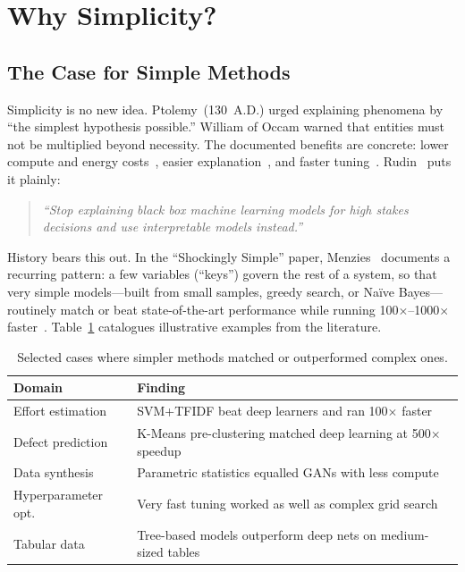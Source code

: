 \documentclass[AMA,STIX2COL]{WileyNJDv5}
\begin{document}
\section{Why Simplicity?}\label{sec:simplicity}

\subsection{The Case for Simple Methods}

Simplicity is no new idea. Ptolemy~(130~A.D.) urged
explaining phenomena by ``the simplest hypothesis
possible.'' William of Occam warned that entities must
not be multiplied beyond necessity. The documented benefits
are concrete: lower compute and energy
costs~\cite{calrero15,monserrate2022cloud}, easier
explanation~\cite{veerappa2011understanding}, and faster
tuning~\cite{fu2016tuning}. Rudin~\cite{rudin2019stop}
puts it plainly:

\begin{quote}
{\em ``Stop explaining black box machine learning models
for high stakes decisions and use interpretable models
instead.''}
\end{quote}

History bears this out. In the ``Shockingly Simple'' paper,
Menzies~\cite{Menzies21shockingly} documents a recurring
pattern: a few variables (``keys'') govern the rest of a
system, so that very simple models---built from small
samples, greedy search, or Na{\"i}ve Bayes---routinely
match or beat state-of-the-art performance while running
100$\times$--1000$\times$
faster~\cite{majumder2018500+,grinsztajn2022why,%
Tawosi23,Ling24,Fu17}. Table~\ref{less} catalogues
illustrative examples from the literature.

\begin{table}[!t]
\caption{Selected cases where simpler methods matched
  or outperformed complex ones.}\label{less}
\begin{tabular}{l|p{5cm}}
\textbf{Domain} & \textbf{Finding} \\ \hline
Effort estimation
  & SVM+TFIDF beat deep learners and ran
    100$\times$ faster~\cite{Tawosi23} \\
Defect prediction
  & K-Means pre-clustering matched deep learning
    at 500$\times$ speedup~\cite{majumder2018500+} \\
Data synthesis
  & Parametric statistics equalled GANs with
    less compute~\cite{Ling24} \\
Hyperparameter opt.
  & Very fast tuning worked as well as
    complex grid search~\cite{Fu17} \\
Tabular data
  & Tree-based models outperform deep nets
    on medium-sized tables~\cite{grinsztajn2022why} \\
\end{tabular}
\end{table}
\end{document}
